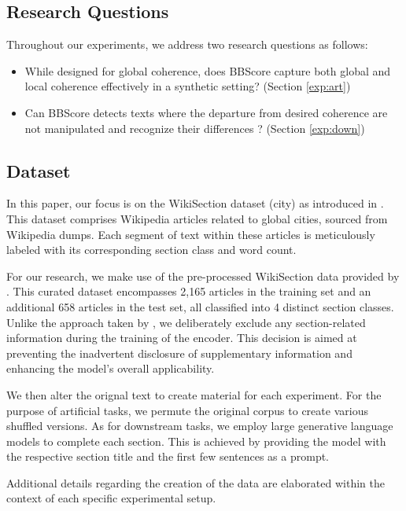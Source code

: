 \documentclass[letterpaper]{article}
\begin{document}
\subsection{Research Questions}
Throughout our experiments, we address two research questions as follows:
\begin{itemize}
    \item While designed for global coherence, does BBScore capture both global and local coherence effectively in a synthetic setting? (Section \ref{exp:art})
    \item Can BBScore detects texts where the departure from desired coherence are not manipulated and recognize their differences ? (Section \ref{exp:down})
\end{itemize}



\subsection{Dataset}

In this paper, our focus is on the WikiSection dataset (city) as introduced in \citep{arnold-etal-2019-sector}. This dataset comprises Wikipedia articles related to global cities, sourced from Wikipedia dumps. Each segment of text within these articles is meticulously labeled with its corresponding section class and word count.

For our research, we make use of the pre-processed WikiSection data provided by \citet{wang2023language}. This curated dataset encompasses 2,165 articles in the training set and an additional 658 articles in the test set, all classified into 4 distinct section classes. Unlike the approach taken by \citet{wang2023language}, we deliberately exclude any section-related information during the training of the encoder. This decision is aimed at preventing the inadvertent disclosure of supplementary information and enhancing the model's overall applicability.

We then alter the orignal text to create material for each experiment. For the purpose of artificial tasks, we permute the original corpus to create various shuffled versions. As for downstream tasks, we employ large generative language models to complete each section. This is achieved by providing the model with the respective section title and the first few sentences as a prompt.

Additional details regarding the creation of the data are elaborated within the context of each specific experimental setup.
\end{document}
